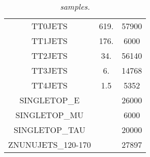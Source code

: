 \documentclass[12pt,a4paper,twoside,english]{report}
\begin{document}
\begin{table}[h!]
\begin{tabular}{||c|c|c||}
    \hline
    TT0JETS & 619.  & 57900\\
    TT1JETS & 176.  &  6000\\
    TT2JETS &  34.  & 56140\\
    TT3JETS &   6.  & 14768\\
    TT4JETS &   1.5 &  5352\\
    \hline
    SINGLETOP\_E   & & 26000\\
    SINGLETOP\_MU  & &  6000\\
    SINGLETOP\_TAU & & 20000\\
    \hline
    ZNUNUJETS\_120-170 & & 27897\\
    \hline
    \hline
  \end{tabular}
  \center\caption{\footnotesize{\em samples.}}
  \label{t:ttjets_sample}
\end{table}
\end{document}

